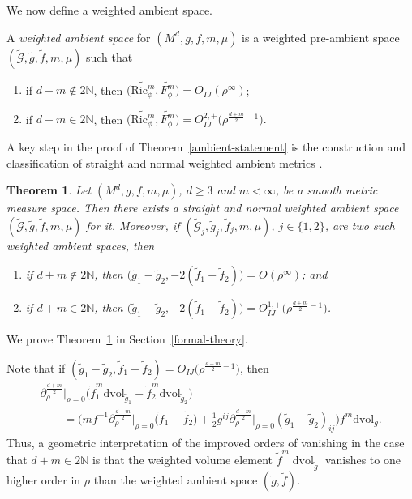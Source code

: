 \documentclass[10pt,a4paper]{amsart}
\newcommand{\cg}{\widetilde{g}}
\newcommand{\cf}{\widetilde{f}}
\newcommand{\cmG}{\widetilde{\mathcal{G}}}
\numberwithin{equation}{section}
\newtheorem{Theorem}{Theorem}[section]
\begin{document}
We now define a weighted ambient space.

\begin{Definition}
A \emph{weighted ambient space} for $(M^d,g,f,m,\mu)$ is a weighted pre-ambient space $(\cmG,\cg,\cf,m,\mu)$ such that
\begin{enumerate}[label=$(\roman*)$]\itemsep=0pt
\item if $d+m\notin 2\mathbb{N}$, then $\big(\widetilde{\mathrm{Ric}_\phi^m},\widetilde{F_\phi^m}\big)=O_{IJ}(\rho^{\infty})$;

\item if $d+m\in 2\mathbb{N}$, then $\big(\widetilde{\mathrm{Ric}_\phi^m},\widetilde{F_\phi^m}\big)=O^{2,+}_{IJ}\big(\rho^{\frac{d+m}{2}-1}\big).$
 \end{enumerate}
\end{Definition}

A key step in the proof of Theorem~\ref{ambient-statement} is the construction and classification of straight and normal weighted ambient metrics \cite{FeffermanGraham2012}.

\begin{Theorem}
 \label{weighted_ambient_metrics_exist}
 Let $(M^d,g,f,m,\mu)$, $d\geq 3$ and $m<\infty$, be a smooth metric measure space. Then there exists a straight and normal weighted ambient space $(\cmG,\cg,\cf,m,\mu)$ for it. Moreover, if $(\cmG_j,\cg_j,\cf_j,m,\mu)$, $j\in\{1,2\}$, are two such weighted ambient spaces, then
\begin{enumerate}[label=$(\roman*)$]\itemsep=0pt
 \item if $d+m\notin 2\mathbb{N}$, then $\big(\cg_1-\cg_2,-2(\cf_1-\cf_2)\big)=O(\rho^\infty)$; and
 \item if $d+m\in 2\mathbb{N}$, then $\big(\cg_1-\cg_2,-2(\cf_1-\cf_2)\big)=O_{IJ}^{1,+}\big(\rho^{\frac{d+m}{2}-1}\big)$.
 \end{enumerate}
\end{Theorem}

We prove Theorem~\ref{weighted_ambient_metrics_exist} in Section~\ref{formal-theory}.

Note that if $(\cg_1-\cg_2,\cf_1-\cf_2)=O_{IJ}\big(\rho^{\frac{d+m}{2}-1}\big)$, then
\begin{gather*}
{\partial^{\frac{d+m}{2}}_\rho}\big|_{\rho=0}\big(\widetilde{f}_1^m\mathrm{dvol}_{\widetilde{g}_1}- \widetilde{f}_2^m\mathrm{dvol}_{\widetilde{g}_2}\big)
\\ \qquad
{}= \biggl(mf^{-1}{\partial_\rho^{\frac{d+m}{2}}}\big|_{\rho=0}\big(\widetilde{f}_1-\widetilde{f}_2\big)
+\frac{1}{2}g^{ij}{\partial_\rho^{\frac{d+m}{2}}}\big|_{\rho=0} (\widetilde{g}_1-\widetilde{g}_2)_{ij}\biggr)f^m\mathrm{dvol}_{g}.
\end{gather*}
Thus, a geometric interpretation of the improved orders of vanishing in the case that $d+m\in 2\mathbb{N}$ is that the weighted volume element $\widetilde{f}^m\operatorname{dvol}_{\widetilde{g}}$ vanishes to one higher order in $\rho$ than the weighted ambient space $(\widetilde{g},\widetilde{f})$.
\end{document}
